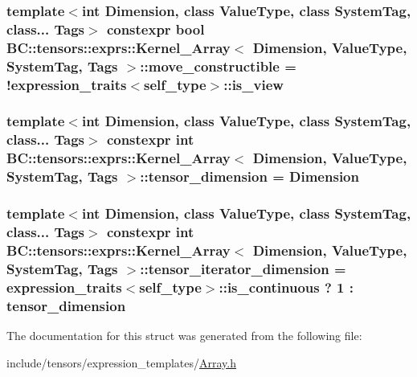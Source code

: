 \subsubsection[{\texorpdfstring{move\+\_\+constructible}{move_constructible}}]{\setlength{\rightskip}{0pt plus 5cm}template$<$int Dimension, class Value\+Type, class System\+Tag, class... Tags$>$ constexpr bool {\bf B\+C\+::tensors\+::exprs\+::\+Kernel\+\_\+\+Array}$<$ Dimension, Value\+Type, System\+Tag, Tags $>$\+::move\+\_\+constructible = !{\bf expression\+\_\+traits}$<${\bf self\+\_\+type}$>$\+::is\+\_\+view\hspace{0.3cm}{\ttfamily [static]}}\hypertarget{structBC_1_1tensors_1_1exprs_1_1Kernel__Array_a04bdb841d9de0f6d9001d3e9610460f4}{}\label{structBC_1_1tensors_1_1exprs_1_1Kernel__Array_a04bdb841d9de0f6d9001d3e9610460f4}
\subsubsection[{\texorpdfstring{tensor\+\_\+dimension}{tensor_dimension}}]{\setlength{\rightskip}{0pt plus 5cm}template$<$int Dimension, class Value\+Type, class System\+Tag, class... Tags$>$ constexpr int {\bf B\+C\+::tensors\+::exprs\+::\+Kernel\+\_\+\+Array}$<$ Dimension, Value\+Type, System\+Tag, Tags $>$\+::tensor\+\_\+dimension = Dimension\hspace{0.3cm}{\ttfamily [static]}}\hypertarget{structBC_1_1tensors_1_1exprs_1_1Kernel__Array_a49172e5da206759267e0e546758da091}{}\label{structBC_1_1tensors_1_1exprs_1_1Kernel__Array_a49172e5da206759267e0e546758da091}
\subsubsection[{\texorpdfstring{tensor\+\_\+iterator\+\_\+dimension}{tensor_iterator_dimension}}]{\setlength{\rightskip}{0pt plus 5cm}template$<$int Dimension, class Value\+Type, class System\+Tag, class... Tags$>$ constexpr int {\bf B\+C\+::tensors\+::exprs\+::\+Kernel\+\_\+\+Array}$<$ Dimension, Value\+Type, System\+Tag, Tags $>$\+::tensor\+\_\+iterator\+\_\+dimension = {\bf expression\+\_\+traits}$<${\bf self\+\_\+type}$>$\+::is\+\_\+continuous ? 1 \+: {\bf tensor\+\_\+dimension}\hspace{0.3cm}{\ttfamily [static]}}\hypertarget{structBC_1_1tensors_1_1exprs_1_1Kernel__Array_ad66157af0fa9827e66c9f962039cc31e}{}\label{structBC_1_1tensors_1_1exprs_1_1Kernel__Array_ad66157af0fa9827e66c9f962039cc31e}


The documentation for this struct was generated from the following file\+:\begin{DoxyCompactItemize}
\item 
include/tensors/expression\+\_\+templates/\hyperlink{Array_8h}{Array.\+h}\end{DoxyCompactItemize}
